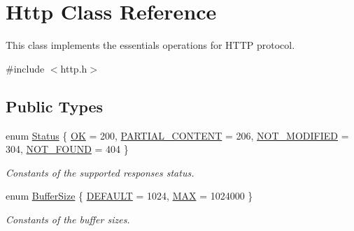 \hypertarget{classHttp}{\section{Http Class Reference}
\label{classHttp}
}


This class implements the essentials operations for H\+T\+T\+P protocol.  




{\ttfamily \#include $<$http.\+h$>$}

\subsection*{Public Types}
\begin{DoxyCompactItemize}
\item 
enum \hyperlink{classHttp_a7ca10575f9881c6af464adf4ce3d5f39}{Status} \{ \hyperlink{classHttp_a7ca10575f9881c6af464adf4ce3d5f39a66a544337cd357d43dd74e2a81e26cd9}{O\+K} = 200, 
\hyperlink{classHttp_a7ca10575f9881c6af464adf4ce3d5f39ac8726afd2f8bffcfa97753f0787ed4ff}{P\+A\+R\+T\+I\+A\+L\+\_\+\+C\+O\+N\+T\+E\+N\+T} = 206, 
\hyperlink{classHttp_a7ca10575f9881c6af464adf4ce3d5f39a970bfd4557dc7b210f39878dd9fadf27}{N\+O\+T\+\_\+\+M\+O\+D\+I\+F\+I\+E\+D} = 304, 
\hyperlink{classHttp_a7ca10575f9881c6af464adf4ce3d5f39a2e8e8d90f1c318947b4b3b2994f297ca}{N\+O\+T\+\_\+\+F\+O\+U\+N\+D} = 404
 \}
\begin{DoxyCompactList}\small\item\em Constants of the supported responses status. \end{DoxyCompactList}\item 
enum \hyperlink{classHttp_aa5fa11782ddf38ff8604c6e0f7c7b5d9}{Buffer\+Size} \{ \hyperlink{classHttp_aa5fa11782ddf38ff8604c6e0f7c7b5d9a2682c6cd33fbef3e70c17289a4f14961}{D\+E\+F\+A\+U\+L\+T} = 1024, 
\hyperlink{classHttp_aa5fa11782ddf38ff8604c6e0f7c7b5d9a54f5ac838c8498e620adea2b484e3ef6}{M\+A\+X} = 1024000
 \}
\begin{DoxyCompactList}\small\item\em Constants of the buffer sizes. \end{DoxyCompactList}\end{DoxyCompactItemize}
